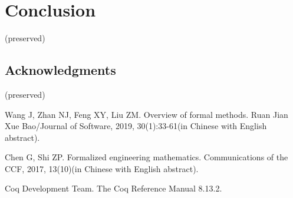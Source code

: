 \documentclass[runningheads,a4paper,english]{llncs}[2022/01/12]
\begin{document}
\section{Conclusion}\label{conclusion}
  (preserved)

\subsection*{Acknowledgments}
  (preserved)

%
%
%
% 
% 
%
\begin{thebibliography}{99}

Wang J, Zhan NJ, Feng XY, Liu ZM. Overview of formal methods. Ruan Jian Xue Bao/Journal of Software, 2019, 30(1):33-61(in Chinese with English abstract). 

Chen G, Shi ZP. Formalized engineering mathematics. Communications of the CCF, 2017, 13(10)(in Chinese with English abstract).

Coq Development Team. The Coq Reference Manual 8.13.2.

\end{thebibliography}
\end{document}
